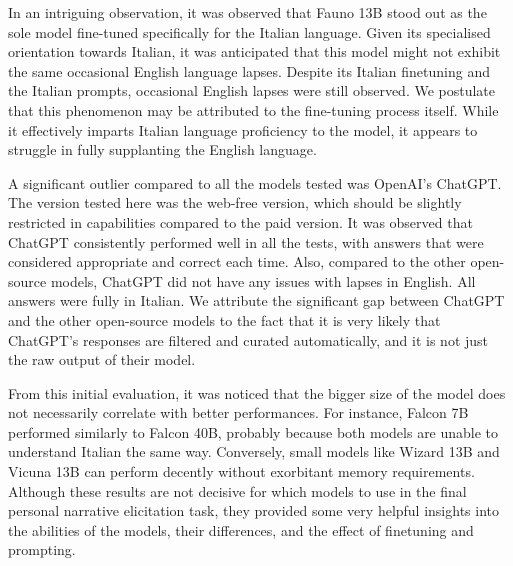In an intriguing observation, it was observed that Fauno 13B \cite{fauno} stood out as the sole model fine-tuned specifically for the Italian language. Given its specialised orientation towards Italian, it was anticipated that this model might not exhibit the same occasional English language lapses. Despite its Italian finetuning and the Italian prompts, occasional English lapses were still observed. We postulate that this phenomenon may be attributed to the fine-tuning process itself. While it effectively imparts Italian language proficiency to the model, it appears to struggle in fully supplanting the English language.

A significant outlier compared to all the models tested was OpenAI's ChatGPT. The version tested here was the web-free version, which should be slightly restricted in capabilities compared to the paid version. It was observed that ChatGPT consistently performed well in all the tests, with answers that were considered appropriate and correct each time. Also, compared to the other open-source models, ChatGPT did not have any issues with lapses in English. All answers were fully in Italian. We attribute the significant gap between ChatGPT and the other open-source models to the fact that it is very likely that ChatGPT's responses are filtered and curated automatically, and it is not just the raw output of their model.

From this initial evaluation, it was noticed that the bigger size of the model does not necessarily correlate with better performances. For instance, Falcon 7B performed similarly to Falcon 40B, probably because both models are unable to understand Italian the same way. Conversely, small models like Wizard 13B and Vicuna 13B can perform decently without exorbitant memory requirements. Although these results are not decisive for which models to use in the final personal narrative elicitation task, they provided some very helpful insights into the abilities of the models, their differences, and the effect of finetuning and prompting.
